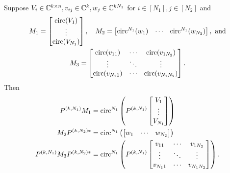 \begin{lemma}\label{lem:interleave}
  Suppose $V_i \in \mathbb{C}^{k \times n}, v_{ij} \in \mathbb{C}^k, w_j \in \mathbb{C}^{k N_1}$ for $i \in [N_1], j \in [N_2]$ and
  \begin{gather*}
    M_1 = \begin{bmatrix} \operatorname{circ}(V_1) \\ \vdots \\ \operatorname{circ}(V_{N_1}) \end{bmatrix},\quad
    M_2 = \begin{bmatrix} \operatorname{circ}^{N_1}(w_1) & \cdots & \operatorname{circ}^{N_1}(w_{N_2}) \end{bmatrix},\ \text{and} \\
    M_3 = \begin{bmatrix} \operatorname{circ}(v_{11}) & \cdots & \operatorname{circ}(v_{1 N_2}) \\ \vdots & \ddots & \vdots \\ \operatorname{circ}(v_{N_1 1}) & \cdots & \operatorname{circ}(v_{N_1 N_2}) \end{bmatrix}.\end{gather*}
  Then
  \begin{align}
    P^{(k, N_1)} M_1 &= \operatorname{circ}^{N_1}\left(P^{(k, N_1)} \begin{bmatrix} V_1 \\ \vdots \\ V_{N_1} \end{bmatrix}\right) \label{eq:M_1} \\
    M_2 P^{(k, N_2)*} &= \operatorname{circ}^{N_1}\left(\begin{bmatrix} w_1 & \cdots & w_{N_2} \end{bmatrix}\right) \label{eq:M_2} \\
    P^{(k, N_1)}M_3P^{(k, N_2)*} &= \operatorname{circ}^{N_1}\left(P^{(k, N_1)} \begin{bmatrix} v_{11} & \cdots & v_{1 N_2} \\ \vdots & \ddots & \vdots \\ v_{N_1 1} & \cdots & v_{N_1 N_2} \end{bmatrix}\right). \label{eq:M_3}
  \end{align}
\end{lemma}


